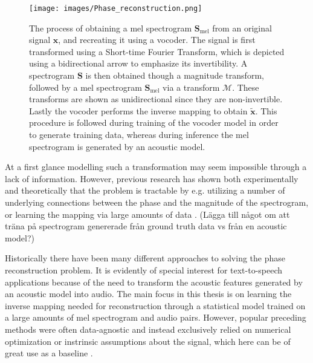 \documentclass{article}
\begin{document}
\begin{figure}[H]
    \centering
    \texttt{[image: images/Phase\_reconstruction.png]}
    \caption{\onehalfspacing The process of obtaining a mel spectrogram $\bm{S}_{\text{mel}}$ from an original signal $\bm{x}$, and recreating it using a vocoder. The signal is first transformed using a Short-time Fourier Transform, which is depicted using a bidirectional arrow to emphasize its invertibility. A spectrogram $\bm{S}$ is then obtained though a magnitude transform, followed by a mel spectrogram $\bm{S}_{\text{mel}}$ via a transform $\mathcal{M}$. These transforms are shown as unidirectional since they are non-invertible. Lastly the vocoder performs the inverse mapping to obtain $\tilde{\bm{x}}$. This procedure is followed during training of the vocoder model in order to generate training data, whereas during inference the mel spectrogram is generated by an acoustic model.}
    \label{fig:phasere}
\end{figure}

At a first glance modelling such a transformation may seem impossible through a lack of information. However, previous research has shown both experimentally and theoretically that the problem is tractable by e.g. utilizing a number of underlying connections between the phase and the magnitude of the spectrogram, or learning the mapping via large amounts of data \cite{kawahara1999restructuring, agiomyrgiannakis2015vocaine, hayes1980signal, auger2012phase}. (Lägga till något om att träna på spectrogram genererade från ground truth data vs från en acoustic model?)

Historically there have been many different approaches to solving the phase reconstruction problem. It is evidently of special interest for text-to-speech applications because of the need to transform the acoustic features generated by an acoustic model into audio. The main focus in this thesis is on learning the inverse mapping needed for reconstruction through a statistical model trained on a large amounts of mel spectrogram and audio pairs. However, popular preceding methods were often data-agnostic and instead exclusively relied on numerical optimization or instrinsic assumptions about the signal, which here can be of great use as a baseline \cite{toda2007voice, griffin1984signal}.

\end{document}

